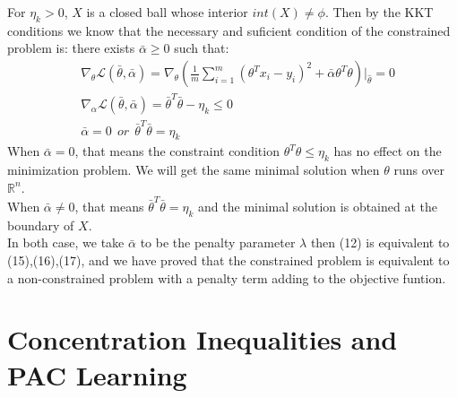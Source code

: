 \begin{example}
	For $\eta_k > 0$, $X$ is a closed ball whose interior $int(X) \ne \phi$. Then by the KKT conditions we know that the necessary and suficient condition of the constrained problem is: there exists $\bar{\alpha} \geq 0$ such that:
	\begin{align}
	&\nabla_\theta \mathcal{L}(\bar{\theta}, \bar{\alpha}) = 	\nabla_\theta (\frac{1}{m} \sum_{i=1}^{m}(\theta^Tx_i-y_i)^2+ \bar{\alpha} \theta^T\theta )|_{\hat{\theta}} = 0 \\ 
	&\nabla_\alpha \mathcal{L}(\bar{\theta}, \bar{\alpha}) = \bar{\theta}^T\bar{\theta}-\eta_k \leq 0 \\
	&\bar{\alpha} = 0 \ \ or \ \ \bar{\theta}^T\bar{\theta}  = \eta_k	      
	\end{align}
	When $\bar{\alpha} = 0$, that means the constraint condition $\theta^T\theta \leq \eta_k$ has no effect on the minimization problem. We will get the same minimal solution when $\theta$ runs over $\mathbb{R}^n$.\\
	When $\bar{\alpha} \ne 0$, that means $\bar{\theta}^T\bar{\theta}  = \eta_k$ and the minimal solution is obtained at the boundary of $X$.\\
	In both case, we take $\bar{\alpha}$ to be the penalty parameter $\lambda$ then (12) is equivalent to (15),(16),(17), and we have proved that the constrained problem is equivalent to a non-constrained problem with a penalty term adding to the objective funtion.
\end{example}
\section{Concentration Inequalities and PAC Learning}
